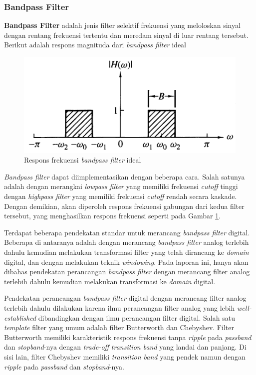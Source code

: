 \documentclass[11pt]{article}
\begin{document}
\subsubsection{Bandpass Filter}

\textbf{Bandpass Filter} adalah jenis filter selektif frekuensi yang meloloskan sinyal dengan rentang frekuensi tertentu dan meredam sinyal di luar rentang tersebut. Berikut adalah respons magnituda dari \textit{bandpass filter} ideal

\begin{figure}[H]
\centerline{\includegraphics[scale=0.4]{figures/fig9-bpfideal.png}}
\caption{Respons frekuensi \textit{bandpass filter} ideal}
\label{bpfideal}
\end{figure}

\textit{Bandpass filter} dapat diimplementasikan dengan beberapa cara. Salah satunya adalah dengan merangkai \textit{lowpass filter} yang memiliki frekuensi \textit{cutoff} tinggi dengan \textit{highpass filter} yang memiliki frekuensi \textit{cutoff} rendah secara kaskade. Dengan demikian, akan diperoleh respons frekuensi gabungan dari kedua filter tersebut, yang menghasilkan respons frekuensi seperti pada Gambar \ref{bpfideal}.

Terdapat beberapa pendekatan standar untuk merancang \textit{bandpass filter} digital. Beberapa di antaranya adalah dengan merancang \textit{bandpass filter} analog terlebih dahulu kemudian melakukan transformasi filter yang telah dirancang ke \textit{domain} digital, dan dengan melakukan teknik \textit{windowing}. Pada laporan ini, hanya akan dibahas pendekatan perancangan \textit{bandpass filter} dengan merancang filter analog terlebih dahulu kemudian melakukan transformasi ke \textit{domain} digital.

Pendekatan perancangan \textit{bandpass filter} digital dengan merancang filter analog terlebih dahulu dilakukan karena ilmu perancangan filter analog yang lebih \textit{well-established} dibandingkan dengan ilmu perancangan filter digital.
Salah satu \textit{template} filter yang umum adalah filter Butterworth dan Chebyshev. Filter Butterworth memiliki karakteristik respons frekuensi tanpa \textit{ripple} pada \textit{passband} dan \textit{stopband}-nya dengan \textit{trade-off} \textit{transition band} yang landai dan panjang. Di sisi lain, filter Chebyshev memiliki \textit{transition band} yang pendek namun dengan \textit{ripple} pada \textit{passband} dan \textit{stopband}-nya.
\end{document}
